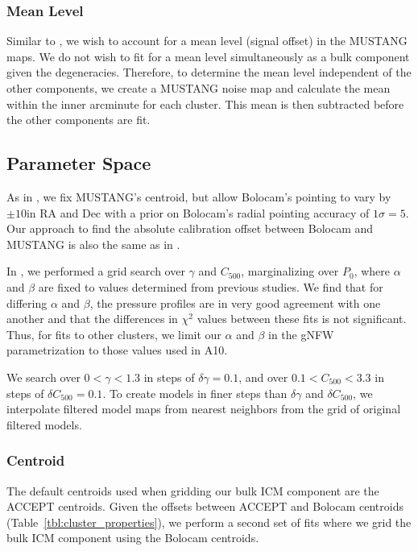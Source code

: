 \documentclass[iop,numberedappendix,apj]{emulateapj}
\begin{document}
\subsubsection{Mean Level}
\label{sec:mean_level}

Similar to \citet{czakon2014}, we wish to account for a mean level (signal offset) in the MUSTANG maps.
We do not wish to fit for a mean level simultaneously as a bulk component given the degeneracies. Therefore,
to determine the mean level independent of the other components, we create a MUSTANG noise map
and calculate the mean within the inner arcminute for each cluster. This mean is then subtracted before 
the other components are fit. 

\subsection{Parameter Space}
\label{sec:param_space}

As in \citet{romero2015a}, we fix MUSTANG's centroid, but allow Bolocam's pointing to vary
by $\pm 10$\asecs in RA and Dec with a prior on Bolocam's radial pointing accuracy of $1\sigma = 5$\asec.
Our approach to find the absolute calibration offset between Bolocam and MUSTANG is also the same as in
\citet{romero2015a}. 

In \citet{romero2015a}, we performed a grid search over $\gamma$ and $C_{500}$, marginalizing over $P_0$,
where $\alpha$ and $\beta$ are fixed to values determined from previous studies. We find that for differing
$\alpha$ and $\beta$, the pressure profiles are in very good agreement with one another and that the 
differences in $\chi^2$ values between these fits is not significant. Thus, for fits to other clusters, 
we limit our $\alpha$ and $\beta$ in the gNFW parametrization to those values used in A10.

We search over $0 < \gamma < 1.3$ in steps of $\delta \gamma = 0.1$, and over
$0.1 < C_{500} < 3.3$ in steps of $\delta C_{500} = 0.1$. To create models in finer steps than $\delta \gamma$ 
and $\delta C_{500}$, we interpolate filtered model maps from nearest neighbors from the grid of original 
filtered models. 

\subsubsection{Centroid}

The default centroids used when gridding our bulk ICM component are the ACCEPT centroids. Given the offsets
between ACCEPT and Bolocam centroids (Table~\ref{tbl:cluster_properties}), we perform a second set of
fits where we grid the bulk ICM component using the Bolocam centroids.
\end{document}
